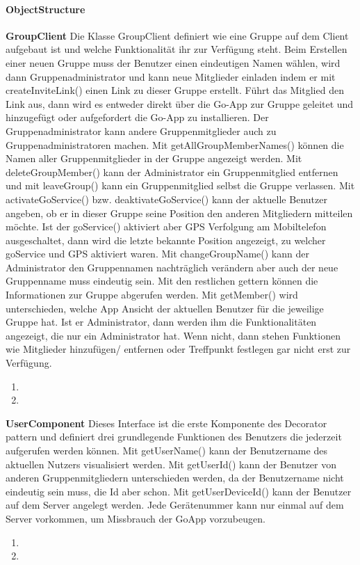 \paragraph{ObjectStructure}

\textbf{GroupClient}
Die Klasse GroupClient definiert wie eine Gruppe auf dem Client aufgebaut ist und welche Funktionalität ihr zur Verfügung steht.
Beim Erstellen einer neuen Gruppe muss der Benutzer einen eindeutigen Namen wählen, wird dann Gruppenadministrator und kann neue Mitglieder einladen indem er mit createInviteLink() einen Link zu dieser Gruppe erstellt. Führt das Mitglied den Link aus, dann wird es entweder direkt über die Go-App zur Gruppe geleitet und hinzugefügt oder aufgefordert die Go-App zu installieren.
Der Gruppenadministrator kann andere Gruppenmitglieder auch zu Gruppenadministratoren machen.
Mit getAllGroupMemberNames() können die Namen aller Gruppenmitglieder in der Gruppe angezeigt werden.
Mit deleteGroupMember() kann der Administrator ein Gruppenmitglied entfernen und mit leaveGroup() kann ein Gruppenmitglied selbst die Gruppe verlassen.
Mit activateGoService() bzw. deaktivateGoService() kann der aktuelle Benutzer angeben, ob er in dieser Gruppe seine Position den anderen Mitgliedern mitteilen möchte. Ist der goService() aktiviert aber GPS Verfolgung am Mobiltelefon ausgeschaltet, dann wird die letzte bekannte Position angezeigt, zu welcher goService und GPS aktiviert waren.
Mit changeGroupName() kann der Administrator den Gruppennamen nachträglich verändern aber auch der neue Gruppenname muss eindeutig sein.
Mit den restlichen gettern können die Informationen zur Gruppe abgerufen werden. Mit getMember() wird unterschieden, welche App Ansicht der aktuellen Benutzer für die jeweilige Gruppe hat. Ist er Administrator, dann werden ihm die Funktionalitäten angezeigt, die nur ein Administrator hat. Wenn nicht, dann stehen Funktionen wie Mitglieder hinzufügen/ entfernen oder Treffpunkt festlegen gar nicht erst zur Verfügung.
\begin{enumerate}
	\item
	\item
\end{enumerate}


\textbf{UserComponent}
Dieses Interface ist die erste Komponente des Decorator pattern und definiert drei grundlegende Funktionen des Benutzers die jederzeit aufgerufen werden können. 
Mit getUserName() kann der Benutzername des aktuellen Nutzers visualisiert werden.
Mit getUserId() kann der Benutzer von anderen Gruppenmitgliedern unterschieden werden, da der Benutzername nicht eindeutig sein muss, die Id aber schon.
Mit getUserDeviceId() kann der Benutzer auf dem Server angelegt werden. Jede Gerätenummer kann nur einmal auf dem Server vorkommen, um Missbrauch der GoApp vorzubeugen.
\begin{enumerate}
	\item
	\item
\end{enumerate}


